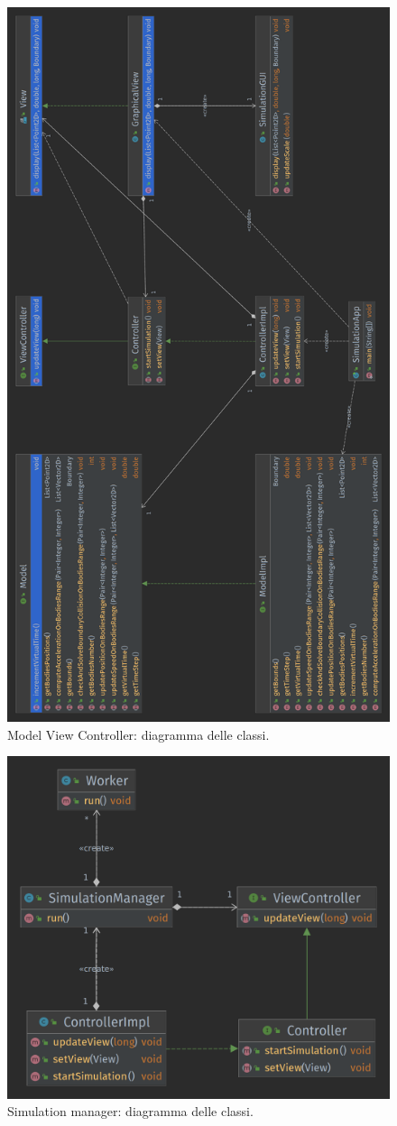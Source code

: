 \documentclass[12pt,a4paper,openright,twoside]{book}
\begin{document}
\begin{figure}
	\centering
	\includegraphics[width=0.7\linewidth]{figures/MVC-class-diagram.png}
	\caption{Model View Controller: diagramma delle classi.}
	\label{fig:mvc}
\end{figure}

\begin{figure}
	\centering
	\includegraphics[width=\linewidth]{figures/simulation-manager.png}
	\caption{Simulation manager: diagramma delle classi.}
	\label{fig:SimulatioManager}
\end{figure}
\end{document}
